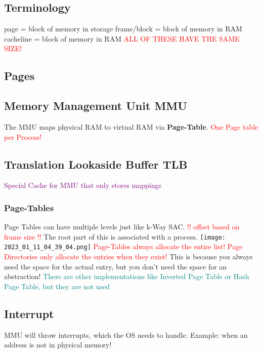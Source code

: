 \documentclass[main.tex,fontsize=8pt,paper=a4,paper=landscape,DIV=calc,]{scrartcl}
\begin{document}
\begin{multicols*}{4}
\subsection{Terminology}
page = block of memory in storage
frame/block = block of memory in RAM
cacheline = block of memory in RAM
\textcolor{red}{ALL OF THESE HAVE THE SAME SIZE!}

\subsection{Pages}

\subsection{Memory Management Unit MMU}
The MMU maps physical RAM to virtual RAM via \textbf{Page-Table}.\newline
\textcolor{red}{One Page table per Process!}

\subsection{Translation Lookaside Buffer TLB}
\textcolor{purple}{Special Cache for MMU that only stores mappings}

\subsubsection{Page-Tables}
Page Tables can have multiple levels just like k-Way SAC. \textcolor{red}{!! offset based on frame size !!}\newline
The root part of this is associated with a process.\newline
\texttt{[image: 2023\_01\_11\_04\_39\_04.png]}\newline
\textcolor{red}{Page-Tables always allocate the entire list! Page Directories only allocate the entries when they exist!}\newline
This is because you always need the space for the actual entry, but you don't need the space for an abstraction!
\textcolor{teal}{There are other implementations like Inverted Page Table or Hash Page Table, but they are not used}

\subsection{Interrupt}
MMU will throw interrupts, which the OS needs to handle.\newline
Example: when an address is not in physical memory!\newline


\end{multicols*}
\end{document}
